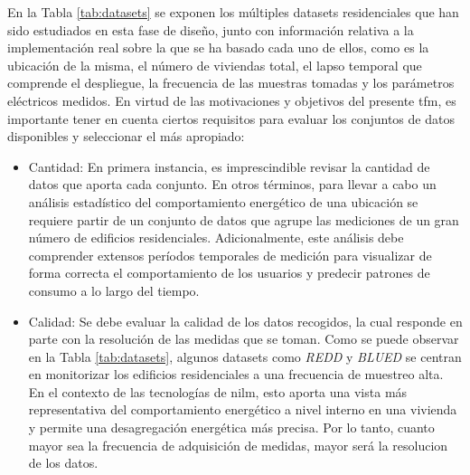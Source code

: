 \vspace{3mm}

En la Tabla \ref{tab:datasets} se exponen los múltiples datasets residenciales que han sido estudiados en esta fase de diseño, junto con información relativa a la implementación real sobre la que se ha basado cada uno de ellos, como es la ubicación de la misma, el número de viviendas total, el lapso temporal que comprende el despliegue, la frecuencia de las muestras tomadas y los parámetros eléctricos medidos. En virtud de las motivaciones y objetivos del presente \gls{tfm}, es importante tener en cuenta ciertos requisitos para evaluar los conjuntos de datos disponibles y seleccionar el más apropiado:

\vspace{1mm}

\begin{itemize}
    \item Cantidad: En primera instancia, es imprescindible revisar la cantidad de datos que aporta cada conjunto. En otros términos, para llevar a cabo un análisis estadístico del comportamiento energético de una ubicación se requiere partir de un conjunto de datos que agrupe las mediciones de un gran número de edificios residenciales. Adicionalmente, este análisis debe comprender extensos períodos temporales de medición para visualizar de forma correcta el comportamiento de los usuarios y predecir patrones de consumo a lo largo del tiempo.
    \item Calidad: Se debe evaluar la calidad de los datos recogidos, la cual responde en parte con la resolución de las medidas que se toman. Como se puede observar en la Tabla \ref{tab:datasets}, algunos datasets como \textit{REDD} y \textit{BLUED} se centran en monitorizar los edificios residenciales a una frecuencia de muestreo alta. En el contexto de las tecnologías de \gls{nilm}, esto aporta una vista más representativa del comportamiento energético a nivel interno en una vivienda y permite una desagregación energética más precisa. Por lo tanto, cuanto mayor sea la frecuencia de adquisición de medidas, mayor será la resolucion de los datos. 
    
    \clearpage


\end{itemize}
